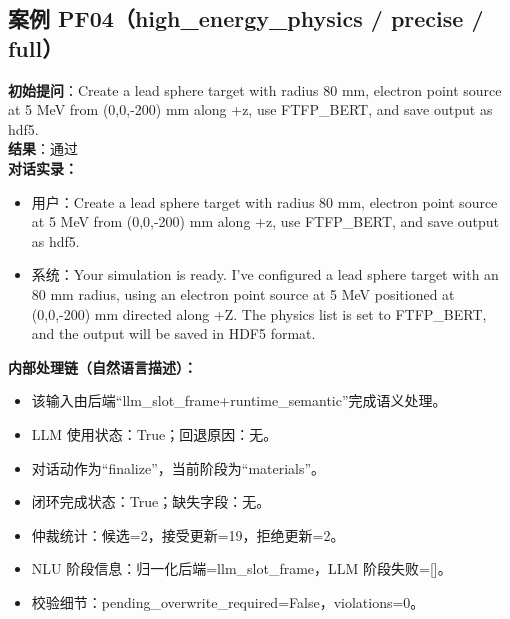 \documentclass[11pt]{ctexart}
\begin{document}
\subsection{案例 PF04（high\_energy\_physics / precise / full）}
\textbf{初始提问}：Create a lead sphere target with radius 80 mm, electron point source at 5 MeV from (0,0,-200) mm along +z, use FTFP\_BERT, and save output as hdf5.\\
\textbf{结果}：通过\\
\textbf{对话实录：}
\begin{itemize}
\item 用户：Create a lead sphere target with radius 80 mm, electron point source at 5 MeV from (0,0,-200) mm along +z, use FTFP\_BERT, and save output as hdf5.
\item 系统：Your simulation is ready. I've configured a lead sphere target with an 80 mm radius, using an electron point source at 5 MeV positioned at (0,0,-200) mm directed along +Z. The physics list is set to FTFP\_BERT, and the output will be saved in HDF5 format.
\end{itemize}
\textbf{内部处理链（自然语言描述）：}
\begin{itemize}
\item 该输入由后端“llm\_slot\_frame+runtime\_semantic”完成语义处理。
\item LLM 使用状态：True；回退原因：无。
\item 对话动作为“finalize”，当前阶段为“materials”。
\item 闭环完成状态：True；缺失字段：无。
\item 仲裁统计：候选=2，接受更新=19，拒绝更新=2。
\item NLU 阶段信息：归一化后端=llm\_slot\_frame，LLM 阶段失败=[]。
\item 校验细节：pending\_overwrite\_required=False，violations=0。
\end{itemize}
\end{document}
